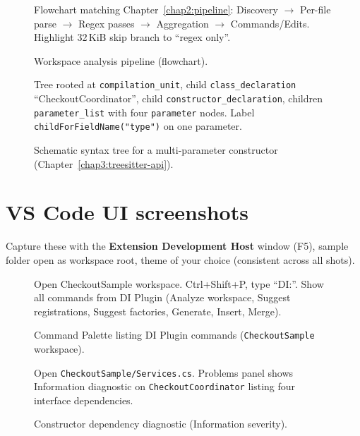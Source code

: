 \begin{figure}[htbp]
\centering
{}%
{Flowchart matching Chapter~\ref{chap2:pipeline}: Discovery $\rightarrow$ Per-file parse $\rightarrow$ Regex passes $\rightarrow$ Aggregation $\rightarrow$ Commands/Edits. Highlight 32\,KiB skip branch to ``regex only''.}
\caption{Workspace analysis pipeline (flowchart).}
\label{fig:pipeline-flowchart}
\end{figure}

\begin{figure}[htbp]
\centering
{}%
{Tree rooted at \texttt{compilation\_unit}, child \texttt{class\_declaration} ``CheckoutCoordinator'', child \texttt{constructor\_declaration}, children \texttt{parameter\_list} with four \texttt{parameter} nodes. Label \texttt{childForFieldName("type")} on one parameter.}
\caption{Schematic syntax tree for a multi-parameter constructor (Chapter~\ref{chap3:treesitter-api}).}
\label{fig:parse-tree}
\end{figure}

\section{VS Code UI screenshots}

Capture these with the \textbf{Extension Development Host} window (F5), sample folder open as workspace root, theme of your choice (consistent across all shots).

\begin{figure}[htbp]
\centering
{}%
{Open CheckoutSample workspace. Ctrl+Shift+P, type ``DI:''. Show all commands from DI Plugin (Analyze workspace, Suggest registrations, Suggest factories, Generate, Insert, Merge).}
\caption{Command Palette listing DI Plugin commands (\texttt{CheckoutSample} workspace).}
\label{fig:command-palette}
\end{figure}

\begin{figure}[htbp]
\centering
{}%
{Open \texttt{CheckoutSample/Services.cs}. Problems panel shows Information diagnostic on \texttt{CheckoutCoordinator} listing four interface dependencies.}
\caption{Constructor dependency diagnostic (Information severity).}
\label{fig:problems-constructor}
\end{figure}


